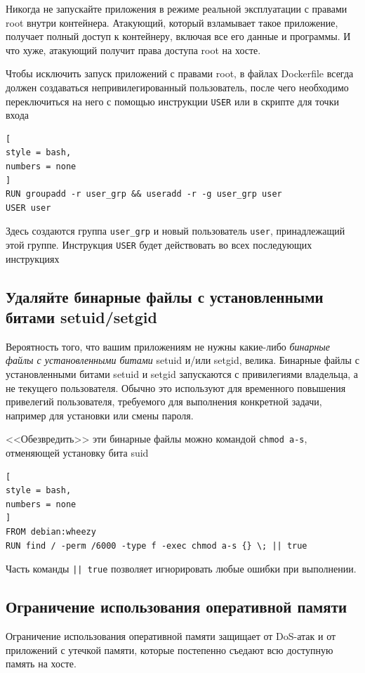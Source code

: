\documentclass[%
	11pt,
	a4paper,
	utf8,
		]{article}
\begin{document}
Никогда не запускайте приложения в режиме реальной эксплуатации с правами root внутри контейнера. Атакующий, который взламывает такое приложение, получает полный доступ к контейнеру, включая все его данные и программы. И что хуже, атакующий получит права доступа root на хосте.

Чтобы исключить запуск приложений с правами root, в файлах Dockerfile всегда должен создаваться непривилегированный пользователь, после чего необходимо переключиться на него с помощью инструкции \verb|USER| или в скрипте для точки входа \cite[]{mouat:docker-2017}
\begin{lstlisting}[
style = bash,
numbers = none
]
RUN groupadd -r user_grp && useradd -r -g user_grp user
USER user
\end{lstlisting}

Здесь создаются группа \verb|user_grp| и новый пользователь \verb|user|, принадлежащий этой группе. Инструкция \verb|USER| будет действовать во всех последующих инструкциях

\subsection{Удаляйте бинарные файлы с установленными битами setuid/setgid}

Вероятность того, что вашим приложениям не нужны какие-либо \emph{бинарные файлы с установленными битами} setuid и/или setgid, велика. Бинарные файлы с установленными битами setuid и setgid запускаются с привилегиями владельца, а не текущего пользователя. Обычно это используют для временного повышения привелегий пользователя, требуемого для выполнения конкретной задачи, например для установки или смены пароля.

<<Обезвредить>> эти бинарные файлы можно командой \verb|chmod a-s|, отменяющей установку бита suid \cite[]{mouat:docker-2017}
\begin{lstlisting}[
style = bash,
numbers = none
]
FROM debian:wheezy
RUN find / -perm /6000 -type f -exec chmod a-s {} \; || true
\end{lstlisting}

Часть команды \texttt{|| true} позволяет игнорировать любые ошибки при выполнении.

\subsection{Ограничение использования оперативной памяти}

Ограничение использования оперативной памяти защищает от DoS-атак и от приложений с утечкой памяти, которые постепенно съедают всю доступную память на хосте.
\end{document}
